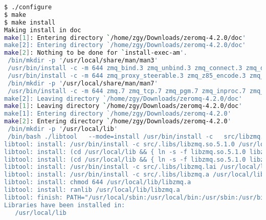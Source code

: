 \begin{lstlisting}[language=bash]
$ ./configure
$ make
$ make install
Making install in doc
make[1]: Entering directory `/home/zgy/Downloads/zeromq-4.2.0/doc'
make[2]: Entering directory `/home/zgy/Downloads/zeromq-4.2.0/doc'
make[2]: Nothing to be done for `install-exec-am'.
 /bin/mkdir -p '/usr/local/share/man/man3'
 /usr/bin/install -c -m 644 zmq_bind.3 zmq_unbind.3 zmq_connect.3 zmq_disconnect.3 zmq_close.3 zmq_ctx_new.3 zmq_ctx_term.3 zmq_ctx_get.3 zmq_ctx_set.3 zmq_ctx_shutdown.3 zmq_msg_init.3 zmq_msg_init_data.3 zmq_msg_init_size.3 zmq_msg_move.3 zmq_msg_copy.3 zmq_msg_size.3 zmq_msg_data.3 zmq_msg_close.3 zmq_msg_send.3 zmq_msg_recv.3 zmq_msg_routing_id.3 zmq_msg_set_routing_id.3 zmq_send.3 zmq_recv.3 zmq_send_const.3 zmq_msg_get.3 zmq_msg_set.3 zmq_msg_more.3 zmq_msg_gets.3 zmq_getsockopt.3 zmq_setsockopt.3 zmq_socket.3 zmq_socket_monitor.3 zmq_poll.3 zmq_errno.3 zmq_strerror.3 zmq_version.3 zmq_sendmsg.3 zmq_recvmsg.3 zmq_proxy.3 '/usr/local/share/man/man3'
 /usr/bin/install -c -m 644 zmq_proxy_steerable.3 zmq_z85_encode.3 zmq_z85_decode.3 zmq_curve_keypair.3 zmq_has.3 zmq_atomic_counter_new.3 zmq_atomic_counter_set.3 zmq_atomic_counter_inc.3 zmq_atomic_counter_dec.3 zmq_atomic_counter_value.3 zmq_atomic_counter_destroy.3 '/usr/local/share/man/man3'
 /bin/mkdir -p '/usr/local/share/man/man7'
 /usr/bin/install -c -m 644 zmq.7 zmq_tcp.7 zmq_pgm.7 zmq_inproc.7 zmq_ipc.7 zmq_null.7 zmq_plain.7 zmq_curve.7 zmq_tipc.7 zmq_vmci.7 zmq_udp.7 '/usr/local/share/man/man7'
make[2]: Leaving directory `/home/zgy/Downloads/zeromq-4.2.0/doc'
make[1]: Leaving directory `/home/zgy/Downloads/zeromq-4.2.0/doc'
make[1]: Entering directory `/home/zgy/Downloads/zeromq-4.2.0'
make[2]: Entering directory `/home/zgy/Downloads/zeromq-4.2.0'
 /bin/mkdir -p '/usr/local/lib'
 /bin/bash ./libtool   --mode=install /usr/bin/install -c   src/libzmq.la '/usr/local/lib'
libtool: install: /usr/bin/install -c src/.libs/libzmq.so.5.1.0 /usr/local/lib/libzmq.so.5.1.0
libtool: install: (cd /usr/local/lib && { ln -s -f libzmq.so.5.1.0 libzmq.so.5 || { rm -f libzmq.so.5 && ln -s libzmq.so.5.1.0 libzmq.so.5; }; })
libtool: install: (cd /usr/local/lib && { ln -s -f libzmq.so.5.1.0 libzmq.so || { rm -f libzmq.so && ln -s libzmq.so.5.1.0 libzmq.so; }; })
libtool: install: /usr/bin/install -c src/.libs/libzmq.lai /usr/local/lib/libzmq.la
libtool: install: /usr/bin/install -c src/.libs/libzmq.a /usr/local/lib/libzmq.a
libtool: install: chmod 644 /usr/local/lib/libzmq.a
libtool: install: ranlib /usr/local/lib/libzmq.a
libtool: finish: PATH="/usr/local/sbin:/usr/local/bin:/usr/sbin:/usr/bin:/sbin:/bin:/usr/games:/usr/local/games:/usr/local/texlive/bin/x86_64-linux:/sbin" ldconfig -n /usr/local/lib
Libraries have been installed in:
   /usr/local/lib


\end{lstlisting}
